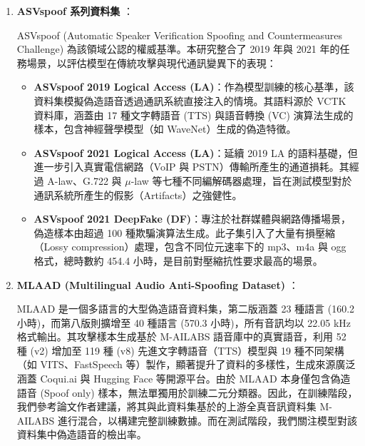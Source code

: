 \begin{enumerate} \item \textbf{ASVspoof 系列資料集} \cite{wang2020asvspoof, yamagishi2021asvspoof}： 


ASVspoof (Automatic Speaker Verification Spoofing and Countermeasures Challenge) 為該領域公認的權威基準。本研究整合了 2019 年與 2021 年的任務場景，以評估模型在傳統攻擊與現代通訊變異下的表現：
    
    \begin{itemize}
        \item \textbf{ASVspoof 2019 Logical Access (LA)}：作為模型訓練的核心基準，該資料集模擬偽造語音透過通訊系統直接注入的情境。其語料源於 VCTK 資料庫，涵蓋由 17 種文字轉語音 (TTS) 與語音轉換 (VC) 演算法生成的樣本，包含神經聲學模型（如 WaveNet）生成的偽造特徵。
        
        \item \textbf{ASVspoof 2021 Logical Access (LA)}：延續 2019 LA 的語料基礎，但進一步引入真實電信網路（VoIP 與 PSTN）傳輸所產生的通道損耗。其經過 A-law、G.722 與 $\mu$-law 等七種不同編解碼器處理，旨在測試模型對於通訊系統所產生的假影（Artifacts）之強健性。
        
        \item \textbf{ASVspoof 2021 DeepFake (DF)}：專注於社群媒體與網路傳播場景，偽造樣本由超過 100 種欺騙演算法生成。此子集引入了大量有損壓縮（Lossy compression）處理，包含不同位元速率下的 mp3、m4a 與 ogg 格式，總時數約 454.4 小時，是目前對壓縮抗性要求最高的場景。
    \end{itemize}

\item \textbf{MLAAD (Multilingual Audio Anti-Spoofing Dataset)} \cite{muller2024mlaad}：

MLAAD 是一個多語言的大型偽造語音資料集，第二版涵蓋 23 種語言 (160.2 小時)，而第八版則擴增至 40 種語言 (570.3 小時)，所有音訊均以 22.05 kHz 格式輸出。其攻擊樣本生成基於 M-AILABS 語音庫中的真實語音，利用 52 種 (v2) 增加至 119 種 (v8) 先進文字轉語音（TTS）模型與 19 種不同架構（如 VITS、FastSpeech 等）製作，顯著提升了資料的多樣性，生成來源廣泛涵蓋 Coqui.ai 與 Hugging Face 等開源平台。由於 MLAAD 本身僅包含偽造語音 (Spoof only) 樣本，無法單獨用於訓練二元分類器。因此，在訓練階段，我們參考論文作者建議，將其與此資料集基於的上游全真音訊資料集 M-AILABS 進行混合，以構建完整訓練數據。而在測試階段，我們關注模型對該資料集中偽造語音的檢出率。


\end{enumerate}
